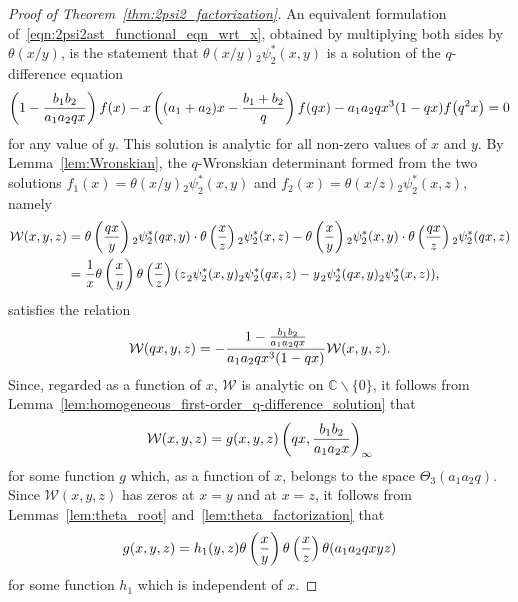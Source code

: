 \documentclass[10pt,a4paper]{amsart}
\numberwithin{equation}{section}
\newcommand{\C}{\mathbb{C}}
\renewcommand{\sp}{\hspace{0.5pt}}
\begin{document}
\begin{proof}[Proof of Theorem~\ref{thm:2psi2_factorization}]
An equivalent formulation of~\eqref{eqn:2psi2ast_functional_eqn_wrt_x}, obtained by multiplying both sides by $\theta(x/y)$, is the statement that $\theta(x/y) {}_2^{}\psi_2^\ast(x,y)$ is a solution of the $q$-difference equation
\[ \left(1-{b_1b_2 \over a_1a_2qx}\right) f(x) - x\left( (a_1+a_2)x - {b_1+b_2 \over q} \right) f(qx) - a_1a_2qx^3 (1-qx) f\bigl(q^2x\bigr) =0 \]
for any value of $y$. This solution is analytic for all non-zero values of $x$ and $y$. By Lemma~\ref{lem:Wronskian}, the $q$-Wronskian determinant formed from the two solutions $f_1(x)=\theta(x/y) {}_2^{}\psi_2^\ast(x,y)$ and $f_2(x)=\theta(x/z) {}_2^{}\psi_2^\ast(x,z)$, namely
\begin{align}
\mathcal{W}(x,y,z) &= \theta\left( {qx \over y} \right) {}_2^{}\psi_2^\ast(qx,y) \cdot \theta\left( {x \over z} \right) {}_2^{}\psi_2^\ast(x,z) - \theta\left( {x \over y} \right) {}_2^{}\psi_2^\ast(x,y) \cdot \theta\left( {qx \over z} \right) {}_2^{}\psi_2^\ast(qx,z) \nonumber \\
&= {1 \over x}\theta\left( {x \over y} \right) \theta\left( {x \over z} \right) ( z \sp {}_2^{}\psi_2^\ast(x,y) {}_2^{}\psi_2^\ast(qx,z) - y \sp {}_2^{}\psi_2^\ast(qx,y){}_2^{}\psi_2^\ast(x,z) ), \label{eqn:2psi2_Wronskian_def}
\end{align}
satisfies the relation
\[ \mathcal{W}(qx,y,z) = -{1-{b_1b_2 \over a_1a_2qx} \over a_1a_2qx^3(1-qx)} \mathcal{W}(x,y,z). \]
Since, regarded as a function of $x$, $\mathcal{W}$ is analytic on $\C \backslash \{0\}$, it follows from Lemma~\ref{lem:homogeneous_first-order_q-difference_solution} that
\[ \mathcal{W}(x,y,z) = g(x,y,z) \left(qx,{b_1b_2 \over a_1a_2x}\right)_{ \infty} \]
for some function $g$ which, as a function of $x$, belongs to the space $\Theta_3(a_1a_2q)$. Since $\mathcal{W}(x,y,z)$ has zeros at $x=y$ and at $x=z$, it follows from Lemmas~\ref{lem:theta_root} and~\ref{lem:theta_factorization} that
\begin{equation} \label{eqn:initial_2psi2_Wronskian_factorization}
g(x,y,z) = h_1(y,z) \theta\left( {x \over y} \right) \theta\left( {x \over z} \right) \theta(a_1a_2qxyz)
\end{equation}
for some function $h_1$ which is independent of $x$.


\end{proof}
\end{document}
